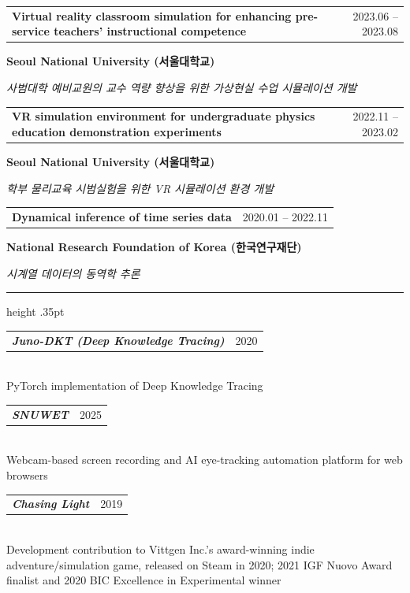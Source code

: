 \documentclass[overlapped,line]{res}
\makeatletter
\renewcommand{\sectionfont}{\normalsize\bfseries\scshape\color{cvnavy}}
\renewcommand{\section}[1]{%
  \par\Needspace{4\baselineskip}\addvspace{.105in}%
  \noindent{\sectionfont #1}\par\vspace{.025in}%
  {\color{cvrule}\hrule height .35pt}\vspace{.045in}%
  \nopagebreak[3]}
\newcommand{\cvdate}[1]{{\small\color{cvmuted}#1}}
\newcommand{\cvdetail}[1]{{\small\color{cvmuted}#1}}
\newcommand{\cvorg}[1]{{\small\bfseries\color{cvblue}#1}}
\newenvironment{cvitems}{
  \begin{list}{}{%
      \setlength{\itemsep}{.062in}
      \setlength{\parsep}{0in}
      \setlength{\parskip}{0in}
      \setlength{\topsep}{.025in}
      \setlength{\partopsep}{0in}
      \setlength{\leftmargin}{.12in}
      \setlength{\rightmargin}{0in}}}{\end{list}}
\newcommand{\dateditem}[2]{%
  \item\begin{tabularx}{\linewidth}[t]{@{}Xr@{}}%
  \textbf{#1} & \cvdate{#2}%
  \end{tabularx}}
\newcommand{\projectitem}[4]{%
  \item\parbox[t]{\linewidth}{%
    \begin{tabularx}{\linewidth}{@{}Xr@{}}%
      \textbf{#1} & \cvdate{#3}%
    \end{tabularx}\par\vspace{.01in}%
    \cvorg{#4}\par\vspace{.005in}%
    \cvdetail{\textit{#2}}}}
\makeatother
\begin{document}
\begin{resume}
\begin{cvitems}
\projectitem{Virtual reality classroom simulation for enhancing pre-service teachers' instructional competence}{사범대학 예비교원의 교수 역량 향상을 위한 가상현실 수업 시뮬레이션 개발}{2023.06 -- 2023.08}{Seoul National University (서울대학교)}
\projectitem{VR simulation environment for undergraduate physics education demonstration experiments}{학부 물리교육 시범실험을 위한 VR 시뮬레이션 환경 개발}{2022.11 -- 2023.02}{Seoul National University (서울대학교)}
\projectitem{Dynamical inference of time series data}{시계열 데이터의 동역학 추론}{2020.01 -- 2022.11}{National Research Foundation of Korea (한국연구재단)}
\end{cvitems}

\section{\sc Development}
\begin{cvitems}
\dateditem{\textit{Juno-DKT (Deep Knowledge Tracing)}}{2020}\\[-.02in]{\small PyTorch implementation of Deep Knowledge Tracing}
\dateditem{\textit{SNUWET}}{2025}\\[-.02in]{\small Webcam-based screen recording and AI eye-tracking automation platform for web browsers}
\dateditem{\textit{Chasing Light}}{2019}\\[-.02in]{\small Development contribution to Vittgen Inc.'s award-winning indie adventure/simulation game, released on Steam in 2020; 2021 IGF Nuovo Award finalist and 2020 BIC Excellence in Experimental winner}
\end{cvitems}


\end{resume}
\end{document}
